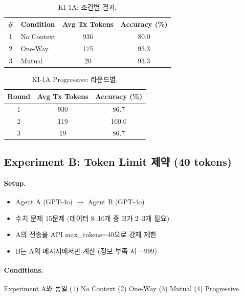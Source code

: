 \documentclass[11pt]{article}
\begin{document}
\begin{table}[h]
\centering
\caption{KI-1A: 조건별 결과.}
\begin{tabular}{clcc}
\toprule
\# & Condition & Avg Tx Tokens & Accuracy (\%) \\
\midrule
1 & No Context       & 936 & 80.0 \\
2 & One-Way          & 175 & 93.3 \\
3 & Mutual           &  20 & 93.3 \\
\bottomrule
\end{tabular}
\end{table}

\begin{table}[h]
\centering
\caption{KI-1A Progressive: 라운드별.}
\begin{tabular}{ccc}
\toprule
Round & Avg Tx Tokens & Accuracy (\%) \\
\midrule
1 & 930 & 86.7 \\
2 & 119 & 100.0 \\
3 &  19 & 86.7 \\
\bottomrule
\end{tabular}
\end{table}


\subsection{Experiment B: Token Limit 제약 (40 tokens)}

\paragraph{Setup.}
\begin{itemize}[nosep]
  \item Agent A (GPT-4o) $\rightarrow$ Agent B (GPT-4o)
  \item 수치 문제 15문제 (데이터 8--10개 중 B가 2--3개 필요)
  \item A의 전송을 API max\_tokens=40으로 강제 제한
  \item B는 A의 메시지에서만 계산 (정보 부족 시 $-999$)
\end{itemize}

\paragraph{Conditions.}
Experiment A와 동일 (1) No Context (2) One-Way (3) Mutual (4) Progressive.
\end{document}
